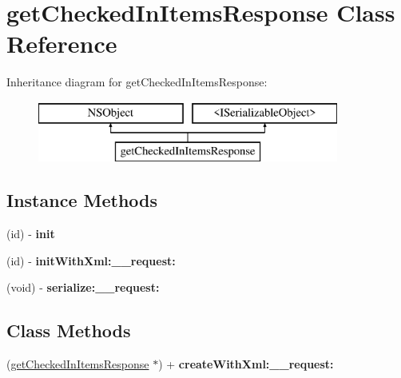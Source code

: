 \hypertarget{interfaceget_checked_in_items_response}{}\section{get\+Checked\+In\+Items\+Response Class Reference}
\label{interfaceget_checked_in_items_response}
Inheritance diagram for get\+Checked\+In\+Items\+Response\+:\begin{figure}[H]
\begin{center}
\leavevmode
\includegraphics[height=2.000000cm]{interfaceget_checked_in_items_response}
\end{center}
\end{figure}
\subsection*{Instance Methods}
\begin{DoxyCompactItemize}
\item 
\hypertarget{interfaceget_checked_in_items_response_a0299aa21b5ecfa1db2ac0169e7cf14a1}{}(id) -\/ {\bfseries init}\label{interfaceget_checked_in_items_response_a0299aa21b5ecfa1db2ac0169e7cf14a1}

\item 
\hypertarget{interfaceget_checked_in_items_response_ac82047b6497cf98e4a74e7bfff19d263}{}(id) -\/ {\bfseries init\+With\+Xml\+:\+\_\+\+\_\+request\+:}\label{interfaceget_checked_in_items_response_ac82047b6497cf98e4a74e7bfff19d263}

\item 
\hypertarget{interfaceget_checked_in_items_response_afc0f0f50f48e966cab01d757cd3e93de}{}(void) -\/ {\bfseries serialize\+:\+\_\+\+\_\+request\+:}\label{interfaceget_checked_in_items_response_afc0f0f50f48e966cab01d757cd3e93de}

\end{DoxyCompactItemize}
\subsection*{Class Methods}
\begin{DoxyCompactItemize}
\item 
\hypertarget{interfaceget_checked_in_items_response_a82504cb2abedf6194e98a60e9118b7bc}{}(\hyperlink{interfaceget_checked_in_items_response}{get\+Checked\+In\+Items\+Response} $\ast$) + {\bfseries create\+With\+Xml\+:\+\_\+\+\_\+request\+:}\label{interfaceget_checked_in_items_response_a82504cb2abedf6194e98a60e9118b7bc}

\end{DoxyCompactItemize}
